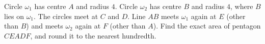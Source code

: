 Circle $\omega_1$ has centre $A$ and radius $4$. Circle $\omega_2$ has centre $B$ and radius $4$, where $B$ lies on $\omega_1$. The circles meet at $C$ and $D$. Line $AB$ meets $\omega_1$ again at $E$ (other than $B$) and meets $\omega_2$ again at $F$ (other than $A$). Find the exact area of pentagon $CEADF$, and round it to the nearest hundredth.
